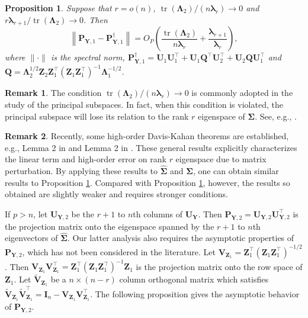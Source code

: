 \documentclass[12pt]{article} %
\DeclareMathOperator{\mytr}{tr}
\newcommand{\bQ}{\mathbf{Q}}
\newcommand{\bZ}{\mathbf{Z}}
\newcommand{\bP}{\mathbf{P}}
\newcommand{\bY}{\mathbf{Y}}
\newcommand{\bI}{\mathbf{I}}
\newcommand{\bU}{\mathbf{U}}
\newcommand{\bV}{\mathbf{V}}
\newcommand{\bfsym}[1]{\ensuremath{\boldsymbol{#1}}}
\def\blambda {\bfsym {\lambda}}
\def\bLambda {\bfsym {\Lambda}}
\def\bSigma {\bfsym {\Sigma}}
\newtheorem{proposition}{Proposition}
\theoremstyle{definition}
\newtheorem{remark}{Remark}
\begin{document}
\begin{proposition}\label{newEigenvectorPropCor}
    Suppose that $r=o(n)$, $\mytr(\bLambda_2)/(n\blambda_r)\to 0$ and $r \blambda_{r+1}/\mytr(\bLambda_2)\to 0$. Then
    \begin{equation*}
        \left\|\bP_{\bY,1} - 
        \bP_{\bY,1}^{\dagger}\right\|
        =O_P\left(\frac{\mytr(\bLambda_2)}{n\blambda_r}+\frac{\blambda_{r+1}}{\blambda_r}\right),
    \end{equation*}
where
$\|\cdot\|$ is the spectral norm,
$
\bP_{\bY,1}^{\dagger}
=\bU_1 \bU_1^\top + \bU_1 \bQ^\top \bU_2^\top
            +\bU_2 \bQ \bU_1^\top
            $ and 
$\bQ
       =
       \bLambda_2^{1/2} \bZ_2 \bZ_1^\top (\bZ_1 \bZ_1^\top)^{-1} \bLambda_1^{-1/2}
       $.
\end{proposition}
\begin{remark}
    The condition $\mytr(\bLambda_2)/(n\blambda_r)\to 0$ is commonly adopted in the study of the principal subspaces.
    In fact, when this condition is violated, the principal subspace will lose its relation to the rank $r$ eigenspace of $\bSigma$. See, e.g., \cite{Nadler2009Finite}.
\end{remark}
\begin{remark}
    Recently, some high-order Davis-Kahan theorems are established, e.g., Lemma 2 in \cite{koltchinskii2016} and Lemma 2 in \cite{fan2017Dist}.
    These general results explicitly characterizes the linear term and high-order error on rank $r$ eigenspace due to matrix perturbation.
    By applying these results to $\hat{\bSigma}$ and $\bSigma$, one can obtain similar results to Proposition \ref{newEigenvectorPropCor}.
    Compared with Proposition \ref{newEigenvectorPropCor},
    however, the results so obtained are slightly weaker and requires stronger conditions. 
\end{remark}

If $p>n$, let $\bU_{\bY,2}$ be the $r+1$ to $n$th columns of $\bU_{\bY}$.
Then $\bP_{\bY,2}=\bU_{\bY,2}\bU_{\bY,2}^\top$ is the projection matrix onto the eigenspace spanned by the $r+1$ to $n$th eigenvectors of $\hat{\bSigma}$.
Our latter analysis also requires the asymptotic properties of $\bP_{\bY,2}$, which has not been considered in the literature.
    Let $\bV_{\bZ_1}=\bZ_1^\top (\bZ_1 \bZ_1^\top)^{-1/2}$.
    Then $\bV_{\bZ_1}\bV_{\bZ_1}^\top=\bZ_1^\top (\bZ_1 \bZ_1^\top)^{-1}\bZ_1$ is the projection matrix onto the row space of $\bZ_1$.
    Let $\tilde{\bV}_{\bZ_1}$ be a $n\times (n-r)$ column orthogonal matrix which satisfies $\tilde{\bV}_{\bZ_1}\tilde{\bV}_{\bZ_1}^\top= \bI_{n}-\bV_{\bZ_1}\bV_{\bZ_1}^\top$.
    The following proposition gives the asymptotic behavior of $\bP_{\bY,2}$.
\end{document}
